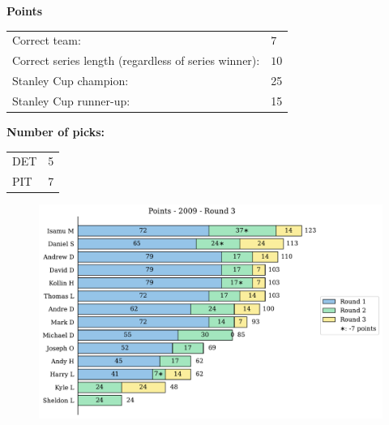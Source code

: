 \documentclass[10pt]{article}
\begin{document}
{\bf Points}\\
\begin{minipage}{12cm}
    \begin{tabular}{l l}
        Correct team:	& $7$\\
        Correct series length (regardless of series winner):	& $10$\\
        Stanley Cup champion:	& 25\\
        Stanley Cup runner-up:	& 15\\
    \end{tabular}

    \vspace{1cm}
    {\bf Number of picks:}\\
    \begin{tabular}{lc }
        DET & 5 \\
        PIT & 7 \\
    \end{tabular}
\end{minipage}
\begin{minipage}[t]{13cm}
    \begin{figure}[H]
        \vspace{-3.5cm}
        \includegraphics[width=12cm]{../../figures/2009/Points-2009-Round3.pdf}
    \end{figure}
\end{minipage}
\end{document}
